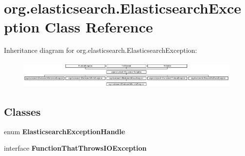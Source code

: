 \hypertarget{classorg_1_1elasticsearch_1_1_elasticsearch_exception}{}\section{org.\+elasticsearch.\+Elasticsearch\+Exception Class Reference}
\label{classorg_1_1elasticsearch_1_1_elasticsearch_exception}
Inheritance diagram for org.\+elasticsearch.\+Elasticsearch\+Exception\+:\begin{figure}[H]
\begin{center}
\leavevmode
\includegraphics[height=1.422222cm]{classorg_1_1elasticsearch_1_1_elasticsearch_exception}
\end{center}
\end{figure}
\subsection*{Classes}
\begin{DoxyCompactItemize}
\item 
enum {\bfseries Elasticsearch\+Exception\+Handle}
\item 
interface {\bfseries Function\+That\+Throws\+I\+O\+Exception}
\end{DoxyCompactItemize}
